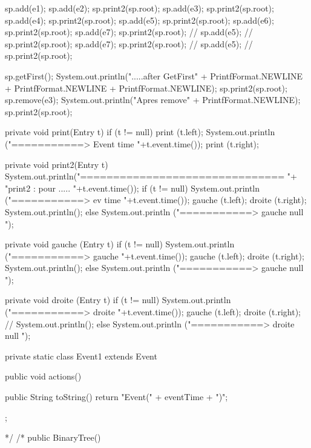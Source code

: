 \begin{hide}
\begin{code}
\begin{hide}
{      sp.add(e1);
      sp.add(e2);
      sp.print2(sp.root);
      sp.add(e3);
      sp.print2(sp.root);
      sp.add(e4);
      sp.print2(sp.root);
      sp.add(e5);
      sp.print2(sp.root);
      sp.add(e6);
      sp.print2(sp.root);
      sp.add(e7);
      sp.print2(sp.root);
      // sp.add(e5);
      // sp.print2(sp.root);
      sp.add(e7);
      sp.print2(sp.root);
      // sp.add(e5);
      // sp.print2(sp.root);

      sp.getFirst();
      System.out.println(".....after GetFirst" +
                         PrintfFormat.NEWLINE +
                         PrintfFormat.NEWLINE +
                         PrintfFormat.NEWLINE);
      sp.print2(sp.root);
      sp.remove(e3);
      System.out.println("Apres remove" + PrintfFormat.NEWLINE);
      sp.print2(sp.root);
   }

   private void print(Entry t) {
      if (t != null){
         print (t.left);
         System.out.println ("===========> Event time "+t.event.time());
         print (t.right);
      }
   }

   private void print2(Entry t) {
      System.out.println("===============================  "+
                         "print2 : pour ..... "+t.event.time());
      if (t != null) {
         System.out.println ("===========> ev time   "+t.event.time());
         gauche (t.left);
         droite (t.right);
         System.out.println();
      }
      else
         System.out.println ("===========> gauche  null ");
   }

   private void gauche (Entry t) {
      if (t != null) {
         System.out.println ("===========> gauche   "+t.event.time());
         gauche (t.left);
         droite (t.right);
         System.out.println();
      }
      else
         System.out.println ("===========> gauche  null ");
   }

   private void droite (Entry t) {
      if (t != null){
         System.out.println ("===========> droite  "+t.event.time());
         gauche (t.left);
         droite (t.right);
         // System.out.println();
      }
      else
         System.out.println ("===========> droite  null ");
   }

   private static class Event1 extends Event {
      public void actions() {}

      public String toString() {
         return "Event(" + eventTime + ")";
      }
   };





*/
   /*
        public  BinaryTree() {

}
\end{hide}
\end{code}
\end{hide}
